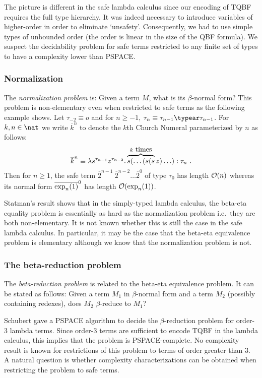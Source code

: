 The picture is different in the safe lambda calculus since our
encoding of TQBF requires the full type hierarchy. It
was indeed necessary to introduce variables of higher-order in order
to eliminate `unsafety'. Consequently, we had to use simple types of
unbounded order (the order is linear in the size of the QBF
formula). We suspect the decidability problem for safe terms
restricted to any finite set of types to have a complexity lower
than PSPACE.


\subsubsection{Normalization}
The \emph{normalization problem} is: Given a term $M$, what is its $\beta$-normal form? This problem is non-elementary even when restricted to safe terms as the following example shows. Let $\tau_{-2}
\equiv o$ and for $n\geq -1$, $\tau_n \equiv \tau_{n-1}\typear
\tau_{n-1}$. For $k,n\in \nat$ we write $\overline{k}^n$ to denote
the $k$th Church Numeral parameterized by $n$ as follows:
$$\overline{k}^n \equiv \lambda s^{\tau_{n-1}}
z^{\tau_{n-2}} . \overbrace{s( \ldots (s (s}^{k\hbox{ times}}z)
\ldots) : \tau_n \ .$$ Then for $n\geq1$, the safe term
$\overline{2}^{n-1}~\overline{2}^{n-2}\ldots \overline{2}^0$ of type
$\tau_0$ has length $\mathcal{O}(n)$ whereas its normal form
$\overline{\exp_{n}(1)}^0$ has length $\mathcal{O}(\exp_{n}(1))$.

Statman's result shows that in the simply-typed lambda calculus, the
beta-eta equality problem is essentially as hard as the
normalization problem i.e.~they are both non-elementary. It is not known whether this is still the
case in the safe lambda calculus. In particular, it may be the case
that the beta-eta equivalence problem is elementary although we know that the normalization problem is not.


\subsubsection{The beta-reduction problem}
The \emph{beta-reduction problem} is related to the beta-eta equivalence problem. It can be stated as follows: Given a term $M_1$ in $\beta$-normal form and a term $M_2$ (possibly containing redexes), does $M_2$ $\beta$-reduce to $M_1$?

Schubert \cite{schubert2001cbr} gave a PSPACE algorithm to decide the $\beta$-reduction problem for order-$3$
lambda terms. Since order-$3$ terms are sufficient to encode TQBF in the lambda calculus, this implies that the problem is PSPACE-complete. No complexity result is known for restrictions of this problem to terms of order greater than $3$. A natural question is whether complexity characterizations can be obtained when restricting the problem to safe terms.
